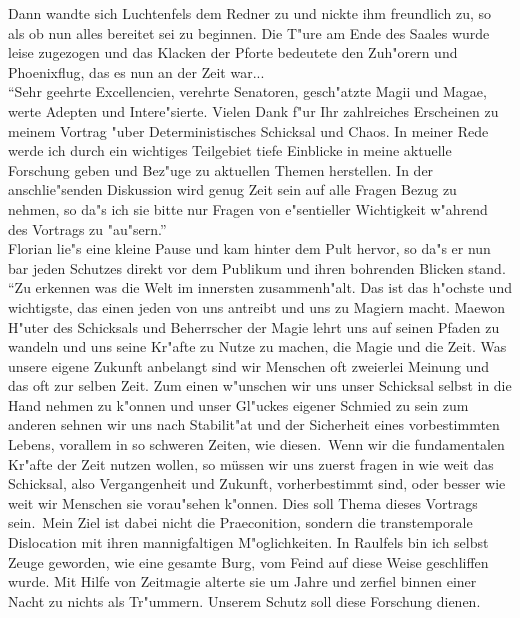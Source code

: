 \documentclass[a5paper,8pt]{book}
\begin{document}
Dann wandte sich Luchtenfels dem Redner zu und nickte ihm freundlich zu, so als ob nun alles bereitet sei zu beginnen. Die T"ure am Ende des Saales wurde leise zugezogen und 
das Klacken der Pforte bedeutete den Zuh"orern und Phoenixflug, das es nun an der Zeit war... \\

``Sehr geehrte Excellencien, verehrte Senatoren, gesch"atzte Magii und Magae, werte Adepten und Intere"sierte. Vielen Dank f"ur Ihr zahlreiches Erscheinen zu meinem Vortrag 
"uber Deterministisches Schicksal und Chaos. In meiner Rede werde ich durch ein wichtiges Teilgebiet tiefe Einblicke in meine aktuelle Forschung geben und Bez"uge zu aktuellen 
Themen herstellen. In der anschlie"senden Diskussion wird genug Zeit sein auf alle Fragen Bezug zu nehmen, so da"s ich sie bitte nur Fragen von e"sentieller Wichtigkeit 
w"ahrend des Vortrags zu "au"sern.''\\

Florian lie"s eine kleine Pause und kam hinter dem Pult hervor, so da"s er nun bar jeden Schutzes direkt vor dem Publikum und ihren bohrenden Blicken stand.\\

``Zu erkennen was die Welt im innersten zusammenh"alt. Das ist das h"ochste und wichtigste, das einen jeden von uns antreibt und uns zu Magiern macht. Maewon H"uter des 
Schicksals und Beherrscher der Magie lehrt uns auf seinen Pfaden zu wandeln und uns seine Kr"afte zu Nutze zu machen, die Magie und die Zeit.
Was unsere eigene Zukunft anbelangt sind wir Menschen oft zweierlei Meinung und das oft zur selben Zeit. Zum einen w"unschen wir uns unser Schicksal selbst in die Hand nehmen 
zu k"onnen und unser Gl"uckes eigener Schmied zu sein zum anderen sehnen wir uns nach Stabilit"at und der Sicherheit eines vorbestimmten Lebens, vorallem in so schweren Zeiten, 
wie diesen.\
Wenn wir die fundamentalen Kr"afte der Zeit nutzen wollen, so müssen wir uns zuerst fragen in wie weit das Schicksal, also Vergangenheit und Zukunft, vorherbestimmt sind, oder 
besser wie weit wir Menschen sie vorau"sehen k"onnen. Dies soll Thema dieses Vortrags sein.\
Mein Ziel ist dabei nicht die Praeconition, sondern die transtemporale Dislocation mit ihren mannigfaltigen M"oglichkeiten.
In Raulfels bin ich selbst Zeuge geworden, wie eine gesamte Burg, vom Feind auf diese Weise geschliffen wurde. Mit Hilfe von Zeitmagie alterte sie um Jahre und zerfiel binnen 
einer Nacht zu nichts als Tr"ummern. Unserem Schutz soll diese Forschung dienen.\\
\end{document}
